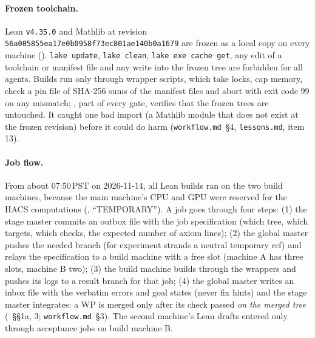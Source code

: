 \begin{sloppypar}
\paragraph{Frozen toolchain.} Lean \texttt{v4.35.0} and Mathlib at revision
\texttt{56a005855ea17e0b0958f73ec801ae140b0a1679} are frozen as a local copy on every machine
(). \texttt{lake update}, \texttt{lake clean}, \texttt{lake exe cache get}, any edit of a
toolchain or manifest file and any write into the frozen tree are forbidden for all agents. Builds run only through
wrapper scripts, which take locks, cap memory, check a pin file of SHA-256 sums of the manifest files and abort with exit
code 99 on any mismatch; , part of every gate, verifies that the frozen trees are untouched. It
caught one bad import (a Mathlib module that does not exist at the frozen revision) before it could do harm
(\texttt{workflow.md}~\S4, \texttt{lessons.md}, item 13).

\paragraph{Job flow.} From about 07:50\,PST on 2026-11-14, all Lean builds ran on the two build machines, because the main
machine's CPU and GPU were reserved for the HACS computations (, ``TEMPORARY''). A job
goes through four steps: (1) the stage master commits an outbox file with the job specification (which tree, which
targets, which checks, the expected number of axiom lines); (2) the global master pushes the needed branch (for
experiment strands a neutral temporary ref) and relays the specification to a build machine with a free slot (machine A
has three slots, machine B two); (3) the build machine builds through the wrappers and pushes its logs to a result
branch for that job; (4) the global master writes an inbox file with the verbatim errors and goal states (never fix
hints) and the stage master integrates: a WP is merged only after its check passed \emph{on the merged tree}
(~\S\S1a, 3; \texttt{workflow.md}~\S3). The second machine's Lean drafts entered only through
acceptance jobs on build machine B.


\end{sloppypar}
